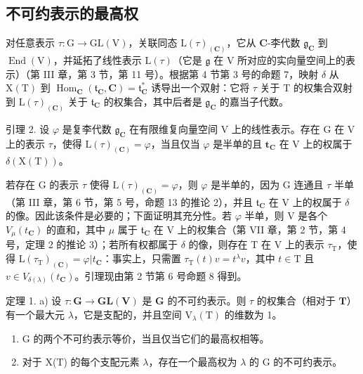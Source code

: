 \subsection{不可约表示的最高权}

对任意表示 \(\tau : \mathrm{G} \to \mathrm{GL}(\mathrm{V})\)，关联同态 \(\mathrm{L}(\tau)_{(\mathbf{C})}\)，它从 \(\mathbf{C}\)-李代数 \(\mathfrak{g}_{\mathbf{C}}\) 到 \(\operatorname{End}(\mathrm{V})\)，并延拓了线性表示 \(\mathrm{L}(\tau)\)（它是 \(\mathfrak{g}\) 在 V 所对应的实向量空间上的表示）（第 III 章，第 3 节，第 11 号）。根据第 4 节第 3 号的命题 7，映射 \(\delta\) 从 \(\mathrm{X}(\mathrm{T})\) 到 \(\operatorname{Hom}_{\mathbf{C}}(\mathfrak{t}_{\mathbf{C}}, \mathbf{C}) = \mathfrak{t}_{\mathbf{C}}^{*}\) 诱导出一个双射：它将 \(\tau\) 关于 T 的权集合双射到 \(\mathrm{L}(\tau)_{(\mathbf{C})}\) 关于 \(\mathfrak{t}_{\mathbf{C}}\) 的权集合，其中后者是 \(\mathfrak{g}_{\mathbf{C}}\) 的嘉当子代数。

引理 2. 设 \(\varphi\) 是复李代数 \(\mathfrak{g}_{\mathbf{C}}\) 在有限维复向量空间 V 上的线性表示。存在 G 在 V 上的表示 \(\tau\)，使得 \(\mathrm{L}(\tau)_{(\mathbf{C})} = \varphi\)，当且仅当 \(\varphi\) 是半单的且 \(\mathbf{t}_{\mathbf{C}}\) 在 V 上的权属于 \(\delta (\mathrm{X(T)})\)。

若存在 G 的表示 \(\tau\) 使得 \(\mathrm{L}(\tau)_{(\mathbf{C})} = \varphi\)，则 \(\varphi\) 是半单的，因为 G 连通且 \(\tau\) 半单（第 III 章，第 6 节，第 5 号，命题 13 的推论 2），并且 \(\mathfrak{t}_{\mathbf{C}}\) 在 V 上的权属于 \(\delta\) 的像。因此该条件是必要的；下面证明其充分性。若 \(\varphi\) 半单，则 V 是各个 \(V_{\mu}(t_{\mathbf{C}})\) 的直和，其中 \(\mu\) 属于 \(\mathfrak{t}_{\mathbf{C}}\) 在 V 上的权集合（第 VII 章，第 2 节，第 4 号，定理 2 的推论 3）；若所有权都属于 \(\delta\) 的像，则存在 T 在 V 上的表示 \(\tau_{\mathrm{T}}\)，使得 \(\mathrm{L}(\tau_{\mathrm{T}})_{(\mathbf{C})} = \varphi |t_{\mathbf{C}}\)：事实上，只需置 \(\tau_{\mathrm{T}}(t)v = t^{\lambda}v\)，其中 \(t \in \mathrm{T}\) 且 \(v \in V_{\delta(\lambda)}(t_{\mathbf{C}})\)。引理现由第 2 节第 6 号命题 8 得到。

定理 1. a) 设 \(\tau : \mathbf{G} \to \mathbf{GL}(\mathbf{V})\) 是 \(\mathbf{G}\) 的不可约表示。则 \(\tau\) 的权集合（相对于 \(\mathbf{T}\)）有一个最大元 \(\lambda\)，它是支配的，并且空间 \(\mathrm{V}_{\lambda}(\mathrm{T})\) 的维数为 1。

\begin{enumerate}
\def\labelenumi{\alph{enumi})}
\setcounter{enumi}{1}
\item
  G 的两个不可约表示等价，当且仅当它们的最高权相等。
\item
  对于 X(T) 的每个支配元素 \(\lambda\)，存在一个最高权为 \(\lambda\) 的 G 的不可约表示。
\end{enumerate}

